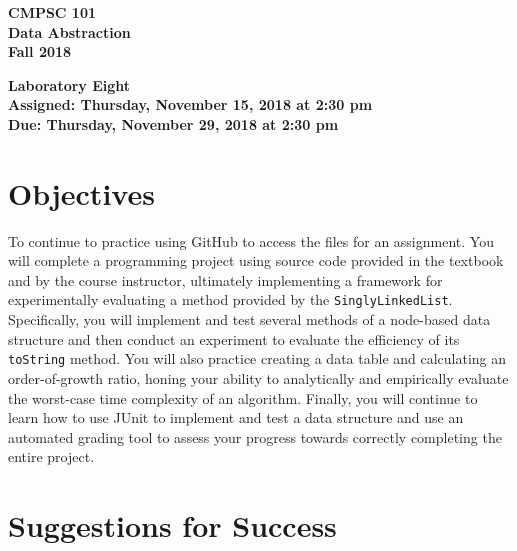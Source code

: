 \documentclass[11pt]{article}
\newcommand{\assignmentduedate}{November 29}
\newcommand{\assignmentassignedate}{November 15}
\newcommand{\assignmentnumber}{Eight}
\newcommand{\labyear}{2018}
\newcommand{\labday}{Thursday}
\newcommand{\labtime}{2:30 pm}
\newcommand{\assigneddate}{Assigned: \labday, \assignmentassignedate, \labyear{} at \labtime{}}
\newcommand{\duedate}{Due: \labday, \assignmentduedate, \labyear{} at \labtime{}}
\newcommand{\program}[1]{\lstinline{#1}}
\newcommand{\labtitle}[1]
{
  \begin{center}
    \begin{center}
      \bf
      CMPSC 101\\Data Abstraction\\
      Fall 2018\\
      \medskip
    \end{center}
    \bf
    #1
  \end{center}
}
\begin{document}
\thispagestyle{empty}

\labtitle{Laboratory \assignmentnumber{} \\ \assigneddate{} \\ \duedate{}}

\section*{Objectives}

To continue to practice using GitHub to access the files for an assignment. You
will complete a programming project using source code provided in the textbook
and by the course instructor, ultimately implementing a framework for
experimentally evaluating a method provided by the \program{SinglyLinkedList}.
Specifically, you will implement and test several methods of a node-based data
structure and then conduct an experiment to evaluate the efficiency of its
\program{toString} method. You will also practice creating a data table and
calculating an order-of-growth ratio, honing your ability to analytically and
empirically evaluate the worst-case time complexity of an algorithm. Finally,
you will continue to learn how to use JUnit to implement and test a data
structure and use an automated grading tool to assess your progress towards
correctly completing the entire project.

\section*{Suggestions for Success}
\end{document}
